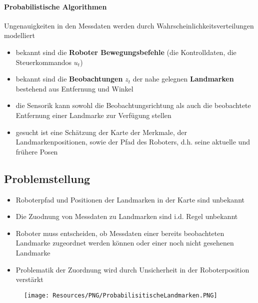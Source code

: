 \paragraph{Probabilistische Algorithmen}
Ungenauigkeiten in den Messdaten werden durch Wahrscheinlichkeitsverteilungen modelliert
\begin{itemize}
	\item bekannt sind die \textbf{Roboter Bewegungsbefehle} (die Kontrolldaten, die Steuerkommandos $u_t$)
	\item bekannt sind die \textbf{Beobachtungen} $z_t$ der nahe gelegnen \textbf{Landmarken} bestehend aus Entfernung und Winkel
	\item die Sensorik kann sowohl die Beobachtungsrichtung als auch die beobachtete Entfernung einer Landmarke zur Verfügung stellen
	\item gesucht ist eine Schätzung der Karte der Merkmale, der Landmarkenpositionen, sowie der Pfad des Roboters, d.h. seine aktuelle und frühere Posen
\end{itemize}
\subsection{Problemstellung}
\begin{itemize}
	\item Roboterpfad und Positionen der Landmarken in der Karte sind unbekannt
	\item Die Zuodnung von Messdaten zu Landmarken sind i.d. Regel unbekannt
	\item Roboter muss entscheiden, ob Messdaten einer bereits beobachteten Landmarke zugeordnet werden können oder einer noch nicht gesehenen Landmarke
	\item Problematik der Zuordnung wird durch Unsicherheit in der Roboterposition verstärkt
\end{itemize}
\begin{figure}[H]
	\begin{center}
		\texttt{[image: Resources/PNG/ProbabilisitischeLandmarken.PNG]}
		\caption{}
		\label{fig:PNG/ProbabilistischeLandmarken.PNG}
	\end{center}
\end{figure}
